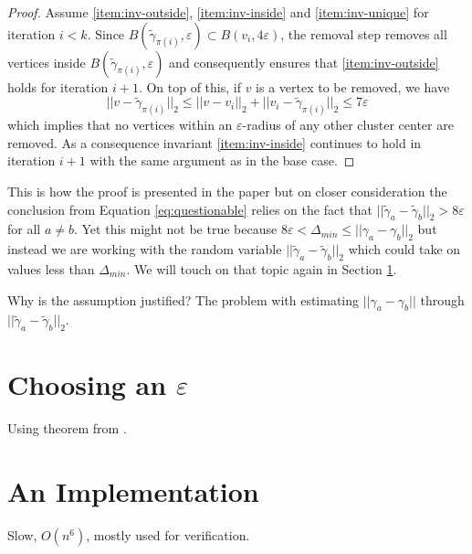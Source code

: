 \documentclass[10pt,a4paper]{article}
\begin{document}
\begin{proof}
  Assume \ref{item:inv-outside}, \ref{item:inv-inside} and \ref{item:inv-unique} for iteration $i < k$.
  Since $B(\tilde{\gamma}_{\pi(i)}, \varepsilon) \subset B(v_{i}, 4\varepsilon)$, the removal step removes all vertices inside $B(\tilde{\gamma}_{\pi(i)}, \varepsilon)$ and consequently ensures that \ref{item:inv-outside} holds for iteration $i + 1$.
  On top of this, if $v$ is a vertex to be removed, we have
  \begin{equation}
    ||v - \tilde{\gamma}_{\pi(i)}||_{2} \le ||v - v_{i}||_{2} + ||v_{i} - \tilde{\gamma}_{\pi(i)}||_{2} \le 7\varepsilon \label{eq:questionable}
  \end{equation}
  which implies that no vertices within an $\varepsilon$-radius of any other cluster center are removed.
  As a consequence invariant \ref{item:inv-inside} continues to hold in iteration $i + 1$ with the same argument as in the base case.
\end{proof}

This is how the proof is presented in the paper but on closer consideration the conclusion from Equation \eqref{eq:questionable} relies on the fact that $||\tilde{\gamma}_{a} - \tilde{\gamma}_{b}||_{2} > 8\varepsilon$ for all $a \ne b$.
Yet this might not be true because $8\varepsilon < \Delta_{min} \le ||\gamma_{a} - \gamma_{b}||_{2}$ but instead we are working with the random variable $||\tilde{\gamma}_{a} - \tilde{\gamma}_{b}||_{2}$ which could take on values less than $\Delta_{min}$.
We will touch on that topic again in Section \ref{sec:epsilon}.

Why is the assumption justified?
The problem with estimating $||\gamma_{a} - \gamma_{b}||$ through $||\tilde{\gamma}_{a} - \tilde{\gamma}_{b}||_{2}$.

\section{Choosing an $\varepsilon$}
\label{sec:epsilon}

Using theorem from \cite{tailbounds}.

\section{An Implementation}
\label{sec:results}

Slow, $O(n^{6})$, mostly used for verification.

{}

\end{document}
